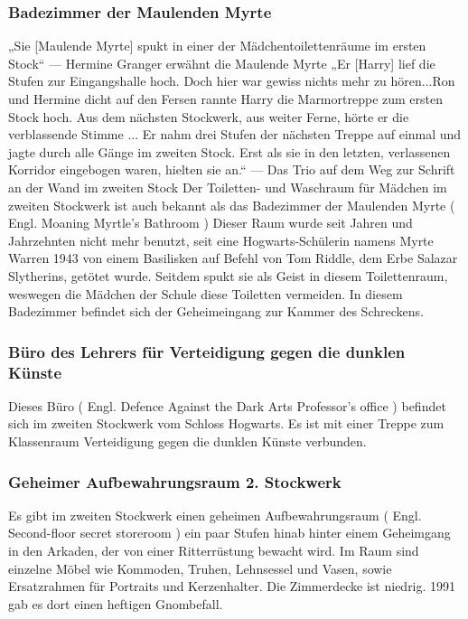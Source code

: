 \documentclass[a4paper, 10pt]{article}
\begin{document}
\subsubsection*{\large Badezimmer der Maulenden Myrte}
„Sie [Maulende Myrte] spukt in einer der Mädchentoilettenräume im ersten Stock“
\vspace{10pt}
\newline
{}  
— Hermine Granger erwähnt die Maulende Myrte
\vspace{10pt}
\newline
{}  
„Er [Harry] lief die Stufen zur Eingangshalle hoch. Doch hier war gewiss nichts mehr zu hören...Ron und Hermine dicht auf den Fersen rannte Harry die Marmortreppe zum ersten Stock hoch. Aus dem nächsten Stockwerk, aus weiter Ferne, hörte er die verblassende Stimme ... Er nahm drei Stufen der nächsten Treppe auf einmal und jagte durch alle Gänge im zweiten Stock. Erst als sie in den letzten, verlassenen Korridor eingebogen waren, hielten sie an.“
\vspace{10pt}
\newline
{}  
— Das Trio auf dem Weg zur Schrift an der Wand im zweiten Stock
\vspace{10pt}
\newline
{}  
Der Toiletten- und Waschraum für Mädchen im zweiten Stockwerk ist auch bekannt als das Badezimmer der Maulenden Myrte (  Engl.  Moaning Myrtle's Bathroom ) Dieser Raum wurde seit Jahren und Jahrzehnten nicht mehr benutzt, seit eine Hogwarts-Schülerin namens Myrte Warren 1943 von einem Basilisken auf Befehl von Tom Riddle, dem Erbe Salazar Slytherins, getötet wurde. Seitdem spukt sie als Geist in diesem Toilettenraum, weswegen die Mädchen der Schule diese Toiletten vermeiden.
\vspace{10pt}
\newline
{}  
In diesem Badezimmer befindet sich der Geheimeingang zur Kammer des Schreckens.

\subsubsection*{\large Büro des Lehrers für Verteidigung gegen die dunklen Künste}
Dieses Büro (  Engl.  Defence Against the Dark Arts Professor's office ) befindet sich im zweiten Stockwerk vom Schloss Hogwarts. Es ist mit einer Treppe zum Klassenraum Verteidigung gegen die dunklen Künste verbunden.

\subsubsection*{\large Geheimer Aufbewahrungsraum 2. Stockwerk}
Es gibt im zweiten Stockwerk einen geheimen Aufbewahrungsraum (  Engl.  Second-floor secret storeroom ) ein paar Stufen hinab hinter einem Geheimgang in den Arkaden, der von einer Ritterrüstung bewacht wird. Im Raum sind einzelne Möbel wie Kommoden, Truhen, Lehnsessel und Vasen, sowie Ersatzrahmen für Portraits und Kerzenhalter. Die Zimmerdecke ist niedrig. 1991 gab es dort einen heftigen Gnombefall.
\end{document}
